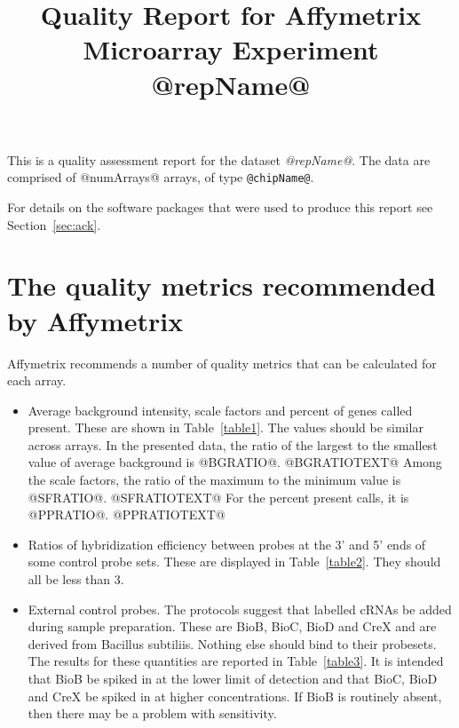 \documentclass[11pt]{article}
\begin{document}
\title{Quality Report for Affymetrix Microarray Experiment @repName@}

\maketitle
\tableofcontents

\vspace{1.08cm}
This is a quality assessment report for the dataset \textit{@repName@}.  
The data are comprised of @numArrays@ arrays, of type \verb+@chipName@+.

For details on the software packages that were used to produce this
report see Section~\ref{sec:ack}.

\section{The quality metrics recommended by Affymetrix}

Affymetrix recommends a number of quality metrics that can be 
calculated for each array.

\begin{itemize}
\item Average background intensity, scale factors and
percent of genes called present. These are shown in 
Table~\ref{table1}. The values should be similar across arrays. 
In the presented data, the
ratio of the largest to the smallest value of average background is
@BGRATIO@.  @BGRATIOTEXT@
Among the scale factors, the ratio of the maximum to the minimum 
value is @SFRATIO@.  @SFRATIOTEXT@ 
For the percent present calls, it is @PPRATIO@. @PPRATIOTEXT@

\item Ratios of hybridization efficiency between 
probes at the 3' and 5' ends of some control probe sets. 
These are displayed in Table~\ref{table2}. They
should all be less than 3.

\item External control probes. The protocols suggest
that labelled cRNAs be added during sample
preparation.  These are BioB, BioC, BioD and CreX and are derived from
Bacillus subtiliis. Nothing else should bind to their
probesets. The results for these quantities are reported in
Table~\ref{table3}. It is intended that BioB be spiked in at the lower
limit of detection and that BioC, BioD and CreX be spiked in at higher
concentrations. If BioB is routinely absent, then there may be a
problem with sensitivity.
\end{itemize}
\end{document}
